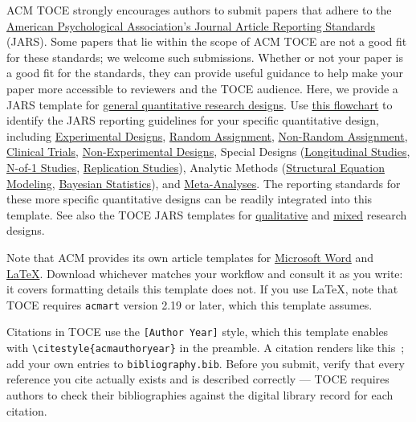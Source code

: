 \documentclass[acmsmall,screen,anonymous,review]{acmart}
\begin{document}
ACM TOCE strongly encourages authors to submit papers that adhere to the \href{https://apastyle.apa.org/jars/}{American Psychological Association’s Journal Article Reporting Standards}  (JARS). Some papers that lie within the scope of ACM TOCE are not a good fit for these standards; we welcome such submissions. Whether or not your paper is a good fit for the standards, they can provide useful guidance to help make your paper more accessible to reviewers and the TOCE audience. Here, we provide a JARS template for \href{https://apastyle.apa.org/jars/quant-table-1.pdf}{general quantitative research designs}. Use \href{https://apastyle.apa.org/jars/jars-quant-participant-flowchart.pdf}{this flowchart} to identify the JARS reporting guidelines for your specific quantitative design, including \href{https://apastyle.apa.org/jars/quant-table-2.pdf}{Experimental Designs}, \href{https://apastyle.apa.org/jars/quant-table-2a.pdf}{Random Assignment}, \href{https://apastyle.apa.org/jars/quant-table-2b.pdf}{Non-Random Assignment}, \href{https://apastyle.apa.org/jars/quant-table-2c.pdf}{Clinical Trials}, \href{https://apastyle.apa.org/jars/quant-table-3.pdf}{Non-Experimental Designs}, Special Designs (\href{https://apastyle.apa.org/jars/quant-table-4.pdf}{Longitudinal Studies}, \href{https://apastyle.apa.org/jars/quant-table-5.pdf}{N-of-1 Studies}, \href{https://apastyle.apa.org/jars/quant-table-6.pdf}{Replication Studies}), Analytic Methods (\href{https://apastyle.apa.org/jars/quant-table-7.pdf}{Structural Equation Modeling}, \href{https://apastyle.apa.org/jars/quant-table-8.pdf}{Bayesian Statistics}), and \href{https://apastyle.apa.org/jars/quant-table-9.pdf}{Meta-Analyses}. The reporting standards for these more specific quantitative designs can be readily integrated into this template. See also the TOCE JARS templates for \href{https://apastyle.apa.org/jars/qualitative}{qualitative} and \href{https://apastyle.apa.org/jars/mixed-methods}{mixed} research designs.


Note that ACM provides its own article templates for \href{https://www.acm.org/binaries/content/assets/publications/taps/acm_submission_template.docx}{Microsoft Word} and \href{https://portalparts.acm.org/hippo/latex_templates/acmart-primary.zip}{LaTeX}. Download whichever matches your workflow and consult it as you write: it covers formatting details this template does not. If you use LaTeX, note that TOCE requires \texttt{acmart} version 2.19 or later, which this template assumes.

Citations in TOCE use the \verb|[Author Year]| style, which this template enables with \verb|\citestyle{acmauthoryear}| in the preamble. A citation renders like this~\cite{Bak2017}; add your own entries to \texttt{bibliography.bib}. Before you submit, verify that every reference you cite actually exists and is described correctly --- TOCE requires authors to check their bibliographies against the digital library record for each citation.
\end{document}
